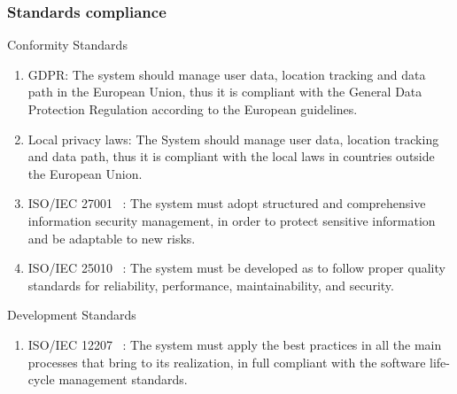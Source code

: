\subsubsection{Standards compliance}
{Conformity Standards}
\begin{enumerate}
\item GDPR: The system should manage user data, location tracking and data path in the European Union, thus it is compliant with the General Data Protection Regulation according to the European guidelines.
\item Local privacy laws: The System should manage user data, location tracking and data path, thus it is compliant with the local laws in countries outside the European Union.
\item ISO/IEC 27001 ~\cite{ISOIEC27001}: The system must adopt structured and comprehensive information security management, in order to protect sensitive information and be adaptable to new risks.
\item ISO/IEC 25010 ~\cite{ISOIEC25010}: The system must be developed as to follow proper quality standards for reliability, performance, maintainability, and security.
\end{enumerate}
{Development Standards}
\begin{enumerate}
\item ISO/IEC 12207 ~\cite{ISOIECIEEE12207}: The system must apply the best practices in all the main processes that bring to its realization, in full compliant with the software life-cycle management standards.
\end{enumerate}
